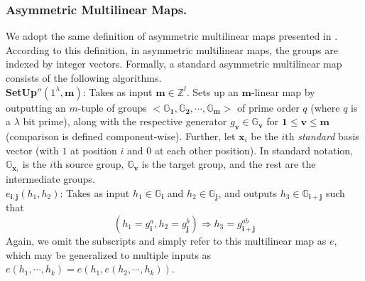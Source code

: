 \subsubsection{Asymmetric Multilinear Maps.} We adopt the same definition of asymmetric multilinear maps presented in \cite{garg2013candidate}. According to this definition, in asymmetric multilinear maps, the groups are indexed by integer vectors. Formally, a standard asymmetric multilinear map consists of the following algorithms.\\

\noindent\textbf{SetUp}$''(1^\lambda,\mathbf{m})$: Takes as input $\mathbf{m}\in\mathbb{Z}^l$. Sets up an $\mathbf{m}$-linear map by outputting an $m$-tuple of groups $<\mathbb{G}_{\mathbf{1}},\mathbb{G}_{\mathbf{2}},\cdots,\mathbb{G}_{\mathbf{m}}>$ of prime order $q$ (where $q$ is a $\lambda$ bit prime), along with the respective generator $g_{\mathbf{v}}\in\mathbb{G}_{\mathbf{v}}$ for $\mathbf{1}\leq \mathbf{v}\leq \mathbf{m}$(comparison is defined component-wise). Further, let $\mathbf{x}_i$ be the $i$th \emph{standard} basis vector (with $1$ at position $i$ and $0$ at each other position). In standard notation, $\mathbb{G}_{\mathbf{x}_i}$ is the $i$th source group, $\mathbb{G}_{\mathbf{v}}$ is the target group, and the rest are the intermediate groups.\\

\noindent$e_{\mathbf{i},\mathbf{j}}(h_1,h_2)$: Takes as input $h_1\in\mathbb{G}_\mathbf{i}$ and $h_2\in\mathbb{G}_\mathbf{j}$, and outputs $h_3\in\mathbb{G}_\mathbf{i+j}$ such that
\begin{equation}
 (h_1=g_\mathbf{i}^a,h_2=g_\mathbf{j}^b)\Rightarrow h_3=g_\mathbf{i+j}^{ab}\nonumber
\end{equation}
\noindent Again, we omit the subscripts and simply refer to this multilinear map as $e$, which may be generalized to multiple inputs as $e(h_1,\cdots,h_k)=e(h_1,e(h_2,\cdots,h_k))$.\\ 

